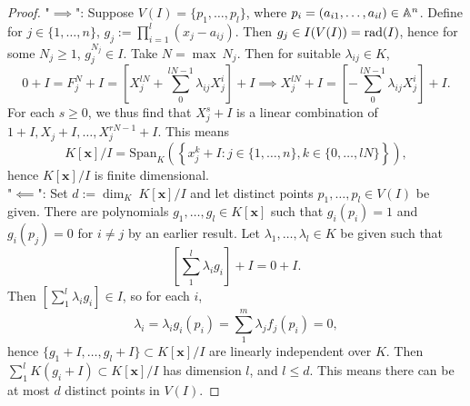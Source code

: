 \begin{proof}
    "$\implies$": Suppose $V(I)=\{p_1,\dots,p_l\}$, where $p_i = (a_{i1},\dots, a_{il})\in \mathbb{A}^n$. Define for $j\in\{1,\dots,n\}$, $g_j := \prod_{i=1}^l(x_j-a_{ij})$. Then $g_j\in I(V(I))=\mathrm{rad}(I)$, hence for some $N_j\geq1$, $g_j^{N_j} \in I$. Take $N=\max\ N_j$. Then for suitable $\lambda_{ij}\in K$, 
    $$0+I=F_j^N+I = \left[X_j^{lN} + \sum_0^{lN-1}\lambda_{ij}X_j^{i} \right] + I \implies X_j^{lN} + I = \left[-\sum_0^{lN-1}\lambda_{ij}X_j^{i}\right]+ I.$$
    For each $s\geq 0$, we thus find that $X_j^s+I$ is a linear combination of $1+I,X_j+I,\dots,X_j^{rN-1}+I$. This means $$K[\mathbf{x}]/I=\mathrm{Span}_K\left(\left\{ x_j^{k}+I : j\in\{1,\dots,n\}, k\in \{0,\dots, lN\} \right\}\right),$$
    hence $K[\mathbf{x}]/I$ is finite dimensional.\\
   "$\impliedby$": Set $d:= \dim_K\ K[\mathbf{x}]/I$ and let distinct points $p_1,\dots,p_l \in V(I)$ be given. There are polynomials $g_1,\dots,g_l\in K[\mathbf{x}]$ such that $g_i(p_i)=1$ and $g_i(p_j)=0$ for $i\neq j$ by an earlier result. Let $\lambda_1,\dots,\lambda_l\in K$ be given such that 
   $$\left[\sum_1^l \lambda_ig_i\right]+ I = 0+I.$$
   Then $\left[\sum_1^l \lambda_ig_i\right]\in I$, so for each $i$,
   $$\lambda_i = \lambda_ig_i(p_i) =\sum_1^m \lambda_jf_j(p_i) = 0,$$
   hence $\{g_1+I,\dots,g_l+I\}\subset K[\mathbf{x}]/I$ are linearly independent over $K$.  Then $\sum_1^l K(g_i+I)\subset K[\mathbf{x}]/I$ has dimension $l$, and $l\leq d$. This means there can be at most $d$ distinct points in $V(I)$.   
\end{proof}
